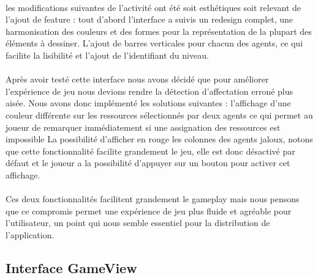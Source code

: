 \documentclass[a4paper, 10pt]{article}
\begin{document}
\paragraph{}
les modifications suivantes de l’activité ont été soit esthétiques soit relevant de l’ajout de feature : tout d’abord l’interface a suivis un redesign complet, une harmonisation des couleurs et des formes pour la représentation de la plupart des éléments à dessiner. L’ajout de barres verticales pour chacun des agents, ce qui facilite la lisibilité et l’ajout de l’identifiant du niveau.
\paragraph{}
    Après avoir testé cette interface nous avons décidé que pour améliorer l'expérience de jeu nous devions rendre la détection d’affectation erroné plus aisée. Nous avons donc implémenté les solutions suivantes :
 l’affichage d’une couleur différente sur les ressources sélectionnés par deux agents ce qui permet au joueur de remarquer immédiatement si une assignation des ressources est impossible
La possibilité d’afficher en rouge les colonnes des agents jaloux, notons que cette fonctionnalité facilite grandement le jeu, elle est donc désactivé par défaut et le joueur a la possibilité d’appuyer sur un bouton pour activer cet affichage.
\paragraph{}
    Ces deux fonctionnalités facilitent grandement le gameplay mais nous pensons que ce compromis permet une expérience de jeu plus fluide et agréable pour l’utilisateur, un point qui nous semble essentiel pour la distribution de l’application. 


	\subsection{Interface GameView}
	
\end{document}
